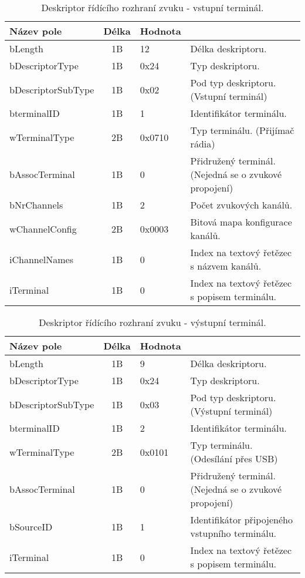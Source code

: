 \begin{table}
\begin{center}
\begin{tabular}{|l|c|l|l|}
\hline 
Název pole & Délka & Hodnota &  \\ 
\hline
bLength & 1B & 12 & Délka deskriptoru.\\
\hline
bDescriptorType & 1B & 0x24 & Typ deskriptoru. \\
\hline
bDescriptorSubType & 1B & 0x02 & Pod typ deskriptoru. (Vstupní terminál)\\
\hline
bterminalID & 1B & 1 & Identifikátor terminálu.\\
\hline
wTerminalType & 2B & 0x0710 & Typ terminálu. (Přijímač rádia)\\
\hline
bAssocTerminal & 1B & 0 & Přidružený terminál. (Nejedná se o zvukové propojení)\\
\hline
bNrChannels & 1B & 2 & Počet zvukových kanálů.\\
\hline
wChannelConfig & 2B & 0x0003 & Bitová mapa konfigurace kanálů.\\
\hline
iChannelNames & 1B & 0 & Index na textový řetězec s názvem kanálů.\\
\hline
iTerminal & 1B & 0 & Index na textový řetězec s popisem terminálu.\\
\hline
\end{tabular}  
\end{center}
\caption{Deskriptor řídícího rozhraní zvuku - vstupní terminál.}
\label{tab:usb-aud-ctrl-in} 
\end{table}

\begin{table}
\begin{center}
\begin{tabular}{|l|c|l|l|}
\hline 
Název pole & Délka & Hodnota &  \\ 
\hline
bLength & 1B & 9 & Délka deskriptoru.\\
\hline
bDescriptorType & 1B & 0x24 & Typ deskriptoru. \\
\hline
bDescriptorSubType & 1B & 0x03 & Pod typ deskriptoru. (Výstupní terminál)\\
\hline
bterminalID & 1B & 2 & Identifikátor terminálu.\\
\hline
wTerminalType & 2B & 0x0101 & Typ terminálu. (Odesílání přes USB)\\
\hline
bAssocTerminal & 1B & 0 & Přidružený terminál. (Nejedná se o zvukové propojení)\\
\hline
bSourceID & 1B & 1 & Identifikátor připojeného vstupního terminálu. \\
\hline
iTerminal & 1B & 0 & Index na textový řetězec s popisem terminálu.\\
\hline
\end{tabular}  

\end{center}
\caption{Deskriptor řídícího rozhraní zvuku - výstupní terminál.}
\label{tab:usb-aud-ctrl-out} 
\end{table}
\FloatBarrier

